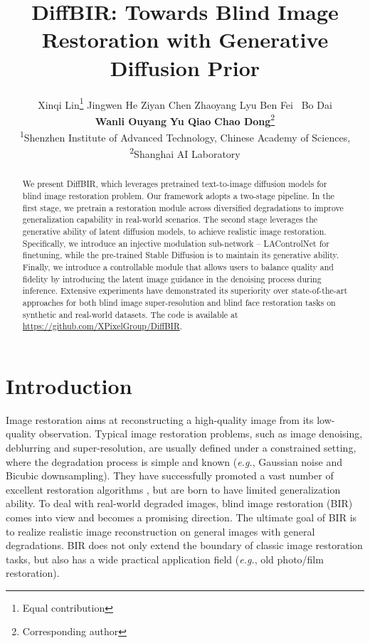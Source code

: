 \documentclass{article}
\title{DiffBIR: Towards Blind Image Restoration with
Generative Diffusion Prior}
\author{Xinqi Lin\thanks{Equal contribution} \quad Jingwen He \quad Ziyan Chen  \quad Zhaoyang Lyu  \quad Ben Fei 
 \, Bo Dai \\ \textbf{Wanli Ouyang}  \quad \textbf{Yu Qiao}  \quad \textbf{Chao Dong}\thanks{Corresponding author}\\
\textsuperscript{1}Shenzhen Institute of Advanced Technology, Chinese Academy of Sciences,\\ \textsuperscript{2}Shanghai AI Laboratory 
}
\begin{document}
\maketitle

\begin{abstract}
We present DiffBIR, which leverages pretrained text-to-image diffusion models for blind image restoration problem. Our framework adopts a two-stage pipeline. In the first stage, we pretrain a restoration module across diversified degradations to improve generalization capability in real-world scenarios. The second stage leverages the generative ability of latent diffusion models, to achieve realistic image restoration. 
Specifically, we introduce an injective modulation sub-network -- LAControlNet for finetuning,
while the pre-trained Stable Diffusion is to maintain its generative ability. 
Finally, we introduce a controllable module that allows users to balance quality and fidelity by introducing the latent image guidance in the denoising process during inference.
Extensive experiments have demonstrated its superiority over state-of-the-art approaches for both blind image super-resolution and blind face restoration tasks on synthetic and real-world datasets. The code is available at \url{https://github.com/XPixelGroup/DiffBIR}.
\end{abstract}

\section{Introduction}
Image restoration aims at reconstructing a high-quality image from its low-quality observation. Typical image restoration problems, such as image denoising, deblurring and super-resolution, are usually defined under a constrained setting, where the degradation process is simple and known (\textit{e.g.}, Gaussian noise and Bicubic downsampling). They have successfully promoted a vast number of excellent restoration algorithms \cite{srcnn, dncnn, swinir, IPT, uformer, restormer, hat}, but are born to have limited generalization ability. To deal with real-world degraded images, blind image restoration (BIR) comes into view and becomes a promising direction. The ultimate goal of BIR is to realize realistic image reconstruction on general images with general degradations. BIR does not only extend the boundary of classic image restoration tasks, but also has a wide practical application field (\textit{e.g.}, old photo/film restoration).
\end{document}
